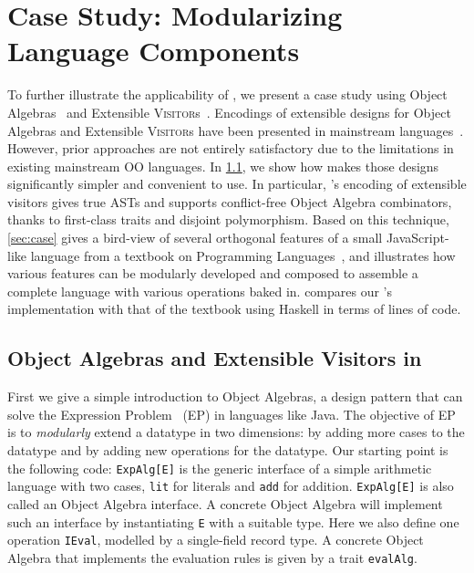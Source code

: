 
\chapter{Case Study: Modularizing Language Components}
\label{chap:case_study}

To further illustrate the applicability of \sedel, we present a case
study using Object Algebras~\cite{oliveira2012extensibility} and
Extensible \textsc{Visitor}s~\cite{oliveira09modular, togersen:2004}. Encodings
of extensible designs for Object Algebras and Extensible \textsc{Visitor}s have
been presented in mainstream languages~\cite{oliveira09modular, togersen:2004, oliveira2012extensibility, oliveira2013feature, rendel14attributes}.
However, prior approaches are not entirely satisfactory
due to the limitations in existing mainstream OO languages. In \cref{sec:ob}, we show how \sedel makes those designs significantly simpler and
convenient to use. In particular, \name's encoding of extensible visitors gives true ASTs and supports
conflict-free Object Algebra combinators, thanks to first-class traits and disjoint polymorphism.
Based on this technique, \cref{sec:case} gives a bird-view of several orthogonal features of
a small JavaScript-like language from a textbook on Programming
Languages~\cite{poplcook}, and illustrates how various features can
be modularly developed and composed to assemble a complete language with various
operations baked in.  compares our \name's implementation
with that of the textbook using Haskell in terms of lines of code.


\section{Object Algebras and Extensible Visitors in \sedel}
\label{sec:ob}

First we give a simple introduction to Object Algebras, a design pattern that
can solve the Expression Problem~\cite{wadler1998expression} (EP) in languages like
Java. The objective of EP is to \emph{modularly} extend a datatype in two
dimensions: by adding more cases to the datatype and by adding new operations
for the datatype.
Our starting point is the following code:
\lstinline{ExpAlg[E]} is the generic interface of a simple arithmetic language
with two cases, \lstinline{lit} for literals and \lstinline{add} for addition.
\lstinline{ExpAlg[E]} is also called an Object Algebra interface. A concrete
Object Algebra will implement such an interface by instantiating \lstinline{E}
with a suitable type. Here we also define one operation \lstinline{IEval},
modelled by a single-field record type. A concrete Object Algebra that
implements the evaluation rules is given by a trait
\lstinline{evalAlg}.

